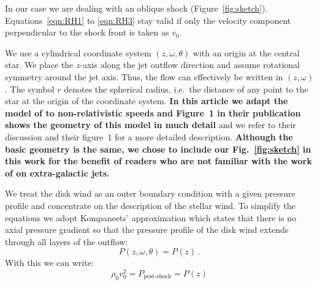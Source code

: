 In our case we are dealing with an oblique shock (Figure~\ref{fig:sketch}). Equations~\ref{eqn:RH1} to \ref{eqn:RH3} stay valid if only the velocity component perpendicular to the shock front is taken as $v_0$. 

We use a cylindrical coordinate system $(z, \omega, \theta)$ with an origin at the central star. We place the $z$-axis along the jet outflow direction and assume rotational symmetry around the jet axis. Thus, the flow can effectively be written in $(z,\omega)$. The symbol $r$ denotes the spherical radius, i.e.\ the distance of any point to the star at the origin of the coordinate system. 
\textbf{In this article we adapt the model of 
\citet{2012MNRAS.422.2282K} to non-relativistic speeds and Figure~1 in their publication shows the geometry of this model in much detail} and we refer to their discussion and their figure~1 for a more detailed description. \textbf{Although the basic geometry is the same, we chose to include our Fig.~\ref{fig:sketch} in this work for the benefit of readers who are not familiar with the work of \citet{2012MNRAS.422.2282K} on extra-galactic jets.} 

We treat the disk wind as an outer boundary condition with a given pressure profile and concentrate on the description of the stellar wind. To simplify the equations we adopt Kompaneets' approximation \citep{1960SPhD....5...46K} which states that there is no axial pressure gradient so that the pressure profile of the disk wind extends through all layers of the outflow:
\begin{equation}
P(z, \omega, \theta) = P(z)\,.
\end{equation}
With this we can write:
\begin{equation}\label{eqn:Pofz}
\rho_0 v_0^2 = P_{\textrm{post-shock}} = P(z)
\end{equation}
